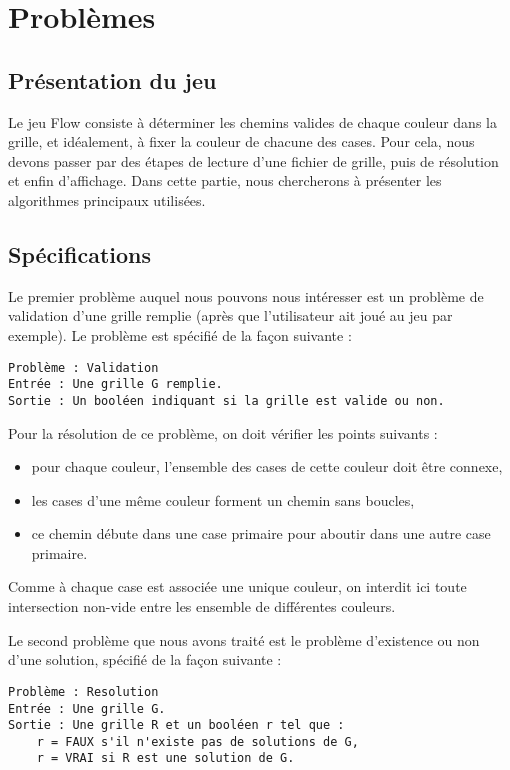 \section{Problèmes}
\subsection{Présentation du jeu}
Le jeu Flow consiste à déterminer les chemins valides de chaque couleur dans la grille, et idéalement, à fixer la couleur de chacune des cases. Pour cela, nous devons passer par des étapes de lecture d'une fichier de grille, puis de résolution et enfin d'affichage. Dans cette partie, nous chercherons à présenter les algorithmes principaux utilisées.

\subsection{Spécifications}
Le premier problème auquel nous pouvons nous intéresser est un problème de validation d'une grille remplie (après que l'utilisateur ait joué au jeu par exemple). Le problème est spécifié de la façon suivante :

\begin{verbatim}
Problème : Validation
Entrée : Une grille G remplie.
Sortie : Un booléen indiquant si la grille est valide ou non.
\end{verbatim}

Pour la résolution de ce problème, on doit vérifier les points suivants :
\begin{itemize}
\item pour chaque couleur, l'ensemble des cases de cette couleur doit être connexe,
\item les cases d'une même couleur forment un chemin sans boucles,
\item ce chemin débute dans une case primaire pour aboutir dans une autre case primaire.
\end{itemize}

Comme à chaque case est associée une unique couleur, on interdit ici toute intersection non-vide entre les ensemble de différentes couleurs.

Le second problème que nous avons traité est le problème d'existence ou non d'une solution, spécifié de la façon suivante :

\begin{verbatim}
Problème : Resolution
Entrée : Une grille G.
Sortie : Une grille R et un booléen r tel que :
    r = FAUX s'il n'existe pas de solutions de G,
    r = VRAI si R est une solution de G.
\end{verbatim}

